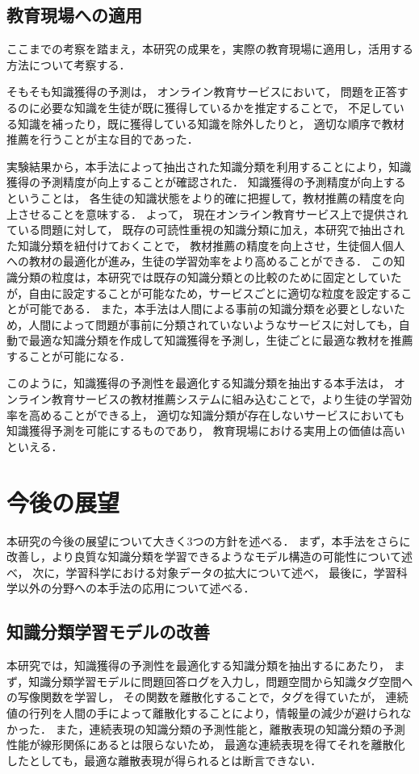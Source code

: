 \subsection{教育現場への適用}
ここまでの考察を踏まえ，本研究の成果を，実際の教育現場に適用し，活用する方法について考察する．

そもそも知識獲得の予測は，
オンライン教育サービスにおいて，
問題を正答するのに必要な知識を生徒が既に獲得しているかを推定することで，
不足している知識を補ったり，既に獲得している知識を除外したりと，
適切な順序で教材推薦を行うことが主な目的であった．

実験結果から，本手法によって抽出された知識分類を利用することにより，知識獲得の予測精度が向上することが確認された．
知識獲得の予測精度が向上するということは，
各生徒の知識状態をより的確に把握して，教材推薦の精度を向上させることを意味する．
よって，
現在オンライン教育サービス上で提供されている問題に対して，
既存の可読性重視の知識分類に加え，本研究で抽出された知識分類を紐付けておくことで，
教材推薦の精度を向上させ，生徒個人個人への教材の最適化が進み，生徒の学習効率をより高めることができる．
この知識分類の粒度は，本研究では既存の知識分類との比較のために固定としていたが，自由に設定することが可能なため，サービスごとに適切な粒度を設定することが可能である．
また，本手法は人間による事前の知識分類を必要としないため，人間によって問題が事前に分類されていないようなサービスに対しても，自動で最適な知識分類を作成して知識獲得を予測し，生徒ごとに最適な教材を推薦することが可能になる．

このように，知識獲得の予測性を最適化する知識分類を抽出する本手法は，
オンライン教育サービスの教材推薦システムに組み込むことで，より生徒の学習効率を高めることができる上，
適切な知識分類が存在しないサービスにおいても知識獲得予測を可能にするものであり，
教育現場における実用上の価値は高いといえる．


\section{今後の展望}
本研究の今後の展望について大きく3つの方針を述べる．
まず，本手法をさらに改善し，より良質な知識分類を学習できるようなモデル構造の可能性について述べ，
次に，学習科学における対象データの拡大について述べ，
最後に，学習科学以外の分野への本手法の応用について述べる．


\subsection{知識分類学習モデルの改善}
本研究では，知識獲得の予測性を最適化する知識分類を抽出するにあたり，
まず，知識分類学習モデルに問題回答ログを入力し，問題空間から知識タグ空間への写像関数を学習し，
その関数を離散化することで，タグを得ていたが，
連続値の行列を人間の手によって離散化することにより，情報量の減少が避けられなかった．
また，連続表現の知識分類の予測性能と，離散表現の知識分類の予測性能が線形関係にあるとは限らないため，
最適な連続表現を得てそれを離散化したとしても，最適な離散表現が得られるとは断言できない．

